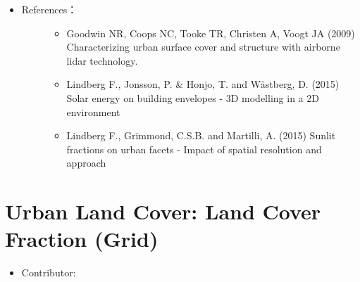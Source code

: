 \documentclass[letterpaper,10pt,english]{sphinxmanual}
\begin{document}
\begin{itemize}
\begin{description}
\begin{itemize}
\end{itemize}

\end{description}

\item {} \begin{description}
\item[{References：}] \leavevmode\begin{itemize}
\item {} 
Goodwin NR, Coops NC, Tooke TR, Christen A, Voogt JA (2009) Characterizing urban surface cover and structure with airborne lidar technology. 

\item {} 
Lindberg F., Jonsson, P. \& Honjo, T. and Wästberg, D. (2015) Solar energy on building envelopes - 3D modelling in a 2D environment 

\item {} 
Lindberg F., Grimmond, C.S.B. and Martilli, A. (2015) Sunlit fractions on urban facets - Impact of spatial resolution and approach 

\end{itemize}

\end{description}

\end{itemize}


\section{Urban Land Cover: Land Cover Fraction (Grid)}
\label{\detokenize{pre-processor/Urban Land Cover Land Cover Fraction (Grid):urban-land-cover-land-cover-fraction-grid}}\label{\detokenize{pre-processor/Urban Land Cover Land Cover Fraction (Grid):landcoverfraction-grid}}\label{\detokenize{pre-processor/Urban Land Cover Land Cover Fraction (Grid)::doc}}\begin{itemize}
\item {} 
Contributor:

\end{itemize}
\end{document}
